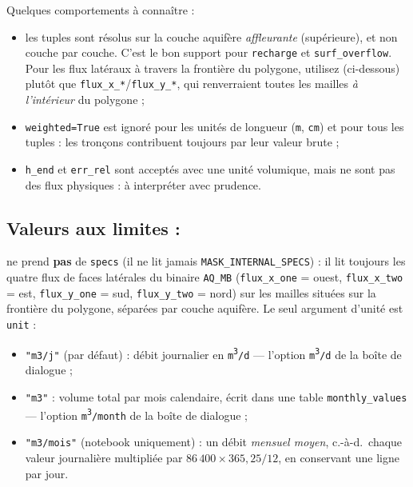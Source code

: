 
Quelques comportements à connaître :
\begin{itemize}
    \item les tuples  sont résolus sur la couche aquifère \emph{affleurante} (supérieure), et non couche par couche. C'est le bon support pour \texttt{recharge} et \texttt{surf\_overflow}. Pour les flux latéraux à travers la frontière du polygone, utilisez  (ci-dessous) plutôt que \texttt{flux\_x\_*}/\texttt{flux\_y\_*}, qui renverraient toutes les mailles \emph{à l'intérieur} du polygone ;
    \item \texttt{weighted=True} est ignoré pour les unités de longueur (\texttt{m}, \texttt{cm}) et pour tous les tuples  : les tronçons contribuent toujours par leur valeur brute ;
    \item \texttt{h\_end} et \texttt{err\_rel} sont acceptés avec une unité volumique, mais ne sont pas des flux physiques : à interpréter avec prudence.
\end{itemize}

\subsection{Valeurs aux limites : }
 ne prend \textbf{pas} de \texttt{specs} (il ne lit jamais \texttt{MASK\_INTERNAL\_SPECS}) : il lit toujours les quatre flux de faces latérales du binaire \texttt{AQ\_MB} (\texttt{flux\_x\_one} = ouest, \texttt{flux\_x\_two} = est, \texttt{flux\_y\_one} = sud, \texttt{flux\_y\_two} = nord) sur les mailles situées sur la frontière du polygone, séparées par couche aquifère. Le seul argument d'unité est \texttt{unit} :
\begin{itemize}
    \item \texttt{"m3/j"} (par défaut) : débit journalier en \texttt{m\textsuperscript{3}/d} --- l'option \texttt{m\textsuperscript{3}/d} de la boîte de dialogue ;
    \item \texttt{"m3"} : volume total par mois calendaire, écrit dans une table \texttt{monthly\_values} --- l'option \texttt{m\textsuperscript{3}/month} de la boîte de dialogue ;
    \item \texttt{"m3/mois"} (notebook uniquement) : un débit \emph{mensuel moyen}, c.-à-d.\ chaque valeur journalière multipliée par $86\,400 \times 365{,}25 / 12$, en conservant une ligne par jour.
\end{itemize}

